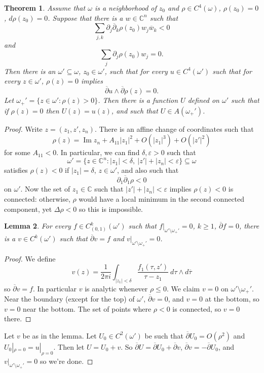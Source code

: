 \documentclass[12pt]{report}
\newcommand{\CC}{\mathbb{C}}
\newcommand{\dbar}{\overline \partial}
\renewcommand{\Im}{\operatorname{Im}}
\newtheorem{theorem}{Theorem}[chapter]
\newtheorem{lemma}[theorem]{Lemma}
\theoremstyle{definition}
\begin{document}
\begin{theorem}
    Assume that $\omega$ is a neighborhood of $z_0$ and $\rho \in C^4(\omega)$, $\rho(z_0) = 0$, $d\rho(z_0) = 0$. Suppose that there is a $w \in \CC^n$ such that
    $$\sum_{j,k} \partial_j \dbar_k \rho(z_0) w_j \overline w_k < 0$$
    and
    $$\sum_j \partial_j \rho(z_0) w_j = 0.$$
    Then there is an $\omega' \subseteq \omega$, $z_0 \in \omega'$, such that for every $u \in C^4(\omega')$ such that for every $z \in \omega'$, $\rho(z) = 0$ implies
    $$\dbar u \wedge \dbar \rho(z) = 0.$$
    Let $\omega_+' = \{z \in \omega': \rho(z) > 0\}$. Then there is a function $U$ defined on $\omega'$ such that if $\rho(z) = 0$ then $U(z) = u(z)$, and such that $U \in A(\omega_+')$.
\end{theorem}
\begin{proof}
    Write $z = (z_1, z', z_n)$. There is an affine change of coordinates such that
    $$\rho(z) = \Im z_n + A_{11}|z_1|^2 + O(|z_1|^3) + O(|z'|^2)$$
    for some $A_{11} < 0$. In particular, we can find $\delta, \varepsilon > 0$ such that
    $$\omega' = \{z \in \CC^n: |z_1| < \delta, ~|z'| + |z_n| < \varepsilon\} \subseteq \omega$$
    satisfies $\rho(z) < 0$ if $|z_1| = \delta$, $z \in \omega'$, and also such that
    $$\partial_1 \dbar_1 \rho < 0$$
    on $\omega'$. Now the set of $z_1 \in \CC$ such that $|z'| + |z_n| < \varepsilon$ implies $\rho(z) < 0$ is connected: otherwise, $\rho$ would have a local minimum in the second connected component, yet $\Delta \rho < 0$ so this is impossible.
\begin{lemma}
    For every $f \in C^k_{(0, 1)}(\omega')$ such that $f|_{\omega' \setminus \omega_+'} = 0$, $k \geq 1$, $\dbar f = 0$, there is a $v \in C^k(\omega')$ such that $\dbar v = f$ and $v|_{\omega' \setminus \omega_+'} = 0$.
\end{lemma}
\begin{proof}
    We define
    $$v(z) = \frac{1}{2\pi i} \int_{|z_1| < \delta} \frac{f_1(\tau, z')}{\tau - z_1} ~d\tau \wedge d\overline \tau$$
    so $\dbar v = f$. In particular $v$ is analytic whenever $\rho \leq 0$. We claim $v = 0$ on $\omega' \setminus \omega_+'$. Near the boundary (except for the top) of $\omega'$, $\dbar v = 0$, and $v = 0$ at the bottom, so $v = 0$ near the bottom. The set of points where $\rho < 0$ is connected, so $v = 0$ there.
\end{proof}
    Let $v$ be as in the lemma. Let $U_0 \in C^2(\omega')$ be such that $\dbar U_0 = O(\rho^2)$ and $U_0|_{\rho=0} = u|_{\rho = 0}$. Then let $U = U_0 + v$. So $\dbar U = \dbar U_0 + \dbar v$, $\dbar v = - \dbar U_0$, and $v|_{\omega' \setminus \omega_+'} = 0$ so we're done.
\end{proof}
\end{document}
